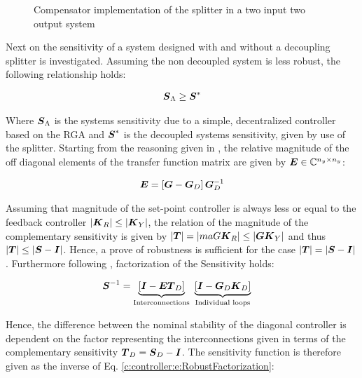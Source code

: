 \begin{figure}[h]
\centering

\caption{Compensator implementation of the splitter in a two input two output system}
\label{c:controller:f:splitter_tito}
\end{figure}


Next on the sensitivity of a system designed with and without a decoupling splitter is investigated. Assuming the non decoupled system is less robust, the following relationship holds:

\begin{align}
\mbox{\boldmath$S$}_{\Lambda} \geq \mbox{\boldmath$S$}^*
\end{align}

Where $\mbox{\boldmath$S$}_{\Lambda}$ is the systems sensitivity due to a simple, decentralized controller based on the RGA and $\mbox{\boldmath$S$}^*$ is the decoupled systems sensitivity, given by use of the splitter. Starting from the reasoning given in \cite[p.443 ff.]{Skogestad2005}, the relative magnitude of the off diagonal elements of the transfer function matrix are given by $\mbox{\boldmath$E$} \in \mathbb{C}^{n_y \times n_y}$:

\begin{align}
\mbox{\boldmath$E$} = \left[ \mbox{\boldmath$G$} - \mbox{\boldmath$G$}_D \right]\mbox{\boldmath$G$}_D^{-1}
\label{c:controller:e:InteractionMagnitude}
\end{align}

Assuming that magnitude of the set-point controller is always less or equal to the feedback controller $\left|\mbox{\boldmath$K$}_R \right|\leq \left|\mbox{\boldmath$K$}_Y\right|$, the relation of the magnitude of the complementary sensitivity is given by $\left|\mbox{\boldmath$T$}\right| = \left|ma{G} \mbox{\boldmath$K$}_R \right| \leq \left|\mbox{\boldmath$G$} \mbox{\boldmath$K$}_Y\right|$ and thus $\left|\mbox{\boldmath$T$}\right| \leq \left|\mbox{\boldmath$S$} - \mbox{\boldmath$I$}\right| $. Hence, a prove of robustness is sufficient for the case $\left|\mbox{\boldmath$T$}\right| = \left|\mbox{\boldmath$S$} - \mbox{\boldmath$I$}\right|$. Furthermore following \cite[p.443]{Skogestad2005}, factorization of the Sensitivity holds:

\begin{align}
\begin{split}
\mbox{\boldmath$S$}^{-1} &=\underbrace{\left[\mbox{\boldmath$I$} - \mbox{\boldmath$E$} \mbox{\boldmath$T$}_D \right]}_{\text{Interconnections}} ~ \underbrace{\left[ \mbox{\boldmath$I$} - \mbox{\boldmath$G$}_D \mbox{\boldmath$K$}_D \right]}_{\text{Individual loops}} 
\end{split}
\label{c:controller:e:RobustFactorization}
\end{align}

Hence, the difference between the nominal stability of the diagonal controller is dependent on the factor representing the interconnections given in terms of the complementary sensitivity $\mbox{\boldmath$T$}_D = \mbox{\boldmath$S$}_D - \mbox{\boldmath$I$} $. The sensitivity function is therefore given as the inverse of Eq. \ref{c:controller:e:RobustFactorization}:

